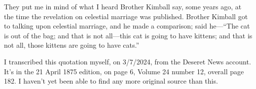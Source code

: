 \begin{compactdesc}
\begin{compactitem}
				\end{compactitem}
			\item[7 April 1875] They put me in mind of what I heard Brother Kimball say, some years ago, at the time the revelation on celestial marriage was published. Brother Kimball got to talking upon celestial marriage, and he made a comparison; said he---``The cat is out of the bag; and that is not all---this cat is going to have kittens; and that is not all, those kittens are going to have cats.''
				\begin{compactitem}
					\item I transcribed this quotation myself, on 3/7/2024, from the Deseret News account. It's in the 21 April 1875 edition, on page 6, Volume 24 number 12, overall page 182. I haven't yet been able to find any more original source than this.
				\end{compactitem}
		\end{compactdesc}
	

	
		
